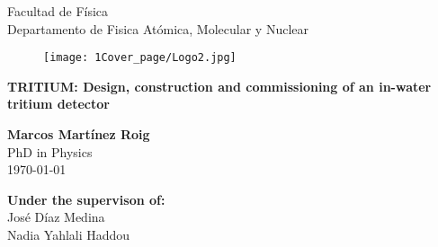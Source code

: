 \begin{titlepage}

\begin{center}


{\large Facultad de Física}\\
{\large Departamento de Fisica Atómica, Molecular y Nuclear}\\
\vspace*{0.2in}
\vspace*{0.6in}
\end{center}
\vspace*{-1in}
\begin{center}
\vspace*{1 cm}


\begin{figure}[htb]
\begin{center}
\texttt{[image: 1Cover\_page/Logo2.jpg]} 
\end{center}
\end{figure}
\vspace*{1 cm}

\begin{large}

\end{large}
\begin{Large}
\textbf{\LARGE TRITIUM: Design, construction and commissioning of an in-water tritium detector} \\
\end{Large}
\vspace*{1.2 cm}

\begin{large}
\textbf{Marcos Martínez Roig}\\
PhD in Physics\\
\today
\end{large}
\end{center}

\vspace*{-1.2 cm}
\begin{large}
\begin{flushright}
\item[\bf Under the supervison of:]\quad  \\ 
José Díaz Medina\\
Nadia Yahlali Haddou\\
\end{flushright}
\end{large}

\end{titlepage}
